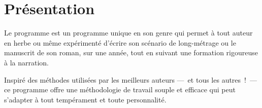 % 
% 
% 
% 
% 
% 
% 
% 

\section{Présentation}\hypertarget{presentation-programme}{}\label{presentation-programme}

Le programme \unan{} est un programme unique en son genre qui permet à tout auteur en herbe ou même expérimenté d'écrire son scénario de long-métrage ou le manuscrit de son roman, sur une année, tout en suivant une formation rigoureuse à la narration.

Inspiré des méthodes utilisées par les meilleurs auteurs —~{}et tous les autres~{}!~{}— ce programme offre une méthodologie de travail souple et efficace qui peut s'adapter à tout tempérament et toute personnalité.

